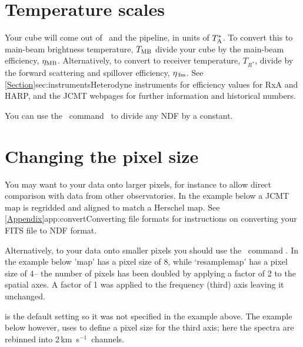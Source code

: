 \documentclass[11pt,oneside,chapters]{starlink}
\providecommand{\sqorst}{\xref{\task{sqorst}}{sun95}{SQORST}}
\newcommand{\kms}{\mbox{$\,$km~s$^{-1}$}}   %
\newcommand{\kms}{\,km~s$^{-1}$}   %
\begin{document}
\section{Temperature scales}
\label{sec:mult}

Your cube will come out of \makecube\, and the pipeline, in units of
$T_{\textnormal{A}}^*$. To convert this to main-beam brightness temperature, $T_{\textnormal{MB}}$
divide your cube by the main-beam efficiency, $\eta_{\textnormal{MB}}$. Alternatively,
to convert to receiver temperature, $T_{R^{*}}$, divide by the forward
scattering and spillover efficiency, $\eta_{\textnormal{\,fss}}$.  See
\cref{Section}{sec:instruments}{Heterodyne instruments} for efficiency
values for RxA and HARP, and the JCMT webpages for further information
and historical numbers.

You can use the \Kappa\ command \cdiv\ to divide any NDF by a constant.

\begin{terminalv}
\end{terminalv}

\section{Changing the pixel size}
\label{sec:rebin}

You may want to  your data onto
larger pixels, for instance to
allow direct comparison with data from other observatories. In the
example below a JCMT map is regridded and aligned to match a Herschel
map. See \cref{Appendix}{app:convert}{Converting file formats} for
instructions on converting your FITS file to NDF format.
\begin{terminalv}
\end{terminalv}

Alternatively, to  your data onto smaller
pixels you should
use the \Kappa\ command \sqorst. In the example below 'map' has a
pixel size of 8\arcsec, while `resamplemap' has a pixel size of 4\arcsec --
the number of pixels has been doubled by applying a factor of 2 to the
spatial axes. A factor of 1 was applied to the frequency (third) axis
leaving it unchanged.
\begin{terminalv}
\end{terminalv}
 is the default setting so it was not specified in
the example above. The example below however, uses
 to define a pixel size for the third axis;
here the spectra are rebinned into 2\kms\ channels.
\begin{terminalv}
\end{terminalv}
\end{document}
